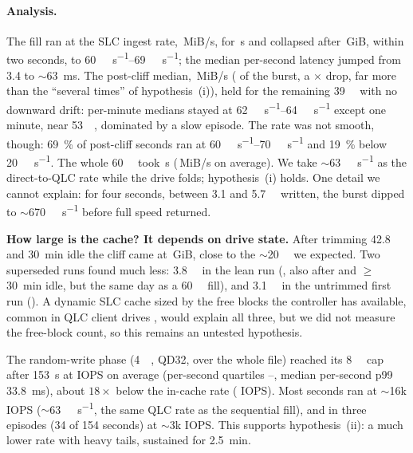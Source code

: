 \paragraph{Analysis.} The fill ran at the SLC ingest rate,
\,MiB/s, for \,s and collapsed
after \,GiB, within two seconds, to
\qtyrange{60}{69}{\mebi\byte\per\second}; the median per-second latency jumped from
\qty{3.4}{} to \ensuremath{\sim}\qty{63}{\milli\second}. The post-cliff median,
\,MiB/s ( of the
burst, a \ssdburstratio$\times$ drop, far more than the \enquote{several times} of hypothesis~(i)), held
for the remaining \qty{39}{\gibi\byte} with no downward drift: per-minute medians stayed at
\qtyrange{62}{64}{\mebi\byte\per\second} except one minute, near \qty{53}{\gibi\byte}, dominated by a
slow episode. The rate was not smooth, though: \qty{69}{\percent} of post-cliff seconds ran at
\qtyrange{60}{70}{\mebi\byte\per\second} and \qty{19}{\percent} below \qty{20}{\mebi\byte\per\second}.
The whole \qty{60}{\gibi\byte} took \,s
(\,MiB/s on average). We take \ensuremath{\sim}\qty{63}{\mebi\byte\per\second}
as the direct-to-QLC rate while the drive folds; hypothesis~(i) holds. One detail we cannot explain: for
four seconds, between \qty{3.1}{} and \qty{5.7}{\gibi\byte} written, the burst dipped to \ensuremath{\sim}\qty{670}{\mebi\byte\per\second}
before full speed returned.

\textbf{How large is the cache? It depends on drive state.} After trimming \qty{42.8}{\gibi\byte} and
\qty{30}{\minute} idle the cliff came at \,GiB, close to the
\ensuremath{\sim}\qty{20}{\gibi\byte} we expected. Two superseded runs found much less: \qty{3.8}{\gibi\byte}
in the lean run (, also after  and $\geq$\qty{30}{\minute} idle,
but the same day as a \qty{60}{\gibi\byte} fill), and \qty{3.1}{\gibi\byte} in the untrimmed first run
(). A dynamic SLC cache sized by the free blocks the controller has
available, common in QLC client drives \cite{tallis2018intel660p,micron2210brief}, would explain all
three, but we did not measure the free-block count, so this remains an untested hypothesis.

The random-write phase (\qty{4}{\kibi\byte}, QD32, over the whole file) reached its
\qty{8}{\gibi\byte} cap after \qty{153}{\second} at  IOPS on
average (per-second quartiles --,
median per-second p99 \qty{33.8}{\milli\second}), about $18\times$ below the in-cache rate
( IOPS). Most seconds ran at
\ensuremath{\sim}\num{16}k IOPS (\ensuremath{\sim}\qty{63}{\mebi\byte\per\second}, the same QLC rate as
the sequential fill), and in three episodes (34 of 154 seconds) at \ensuremath{\sim}\num{3}k IOPS. This
supports hypothesis~(ii): a much lower rate with heavy tails, sustained for \qty{2.5}{\minute}.

